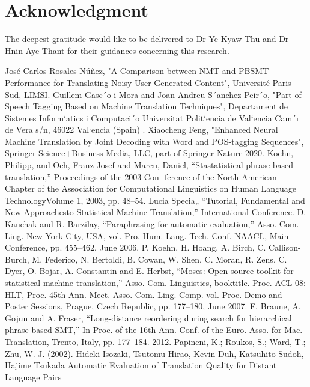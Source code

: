 \documentclass[conference]{IEEEtran}
\begin{document}
\section*{Acknowledgment}
The deepest gratitude would like to be delivered to Dr Ye Kyaw Thu and Dr Hnin Aye Thant for their guidances concerning this research.
\begin{thebibliography}{00}
 José Carlos Rosales Núñez, "A Comparison between NMT and PBSMT Performance for Translating Noisy User-Generated Content", Université Paris Sud, LIMSI.
 Guillem Gasc´o i Mora and Joan Andreu S´anchez Peir´o, "Part-of-Speech Tagging Based on Machine Translation Techniques", Departament de Sistemes Inform`atics i Computaci´o Universitat Polit`encia de Val`encia    Cam´ı de Vera s/n, 46022 Val`encia (Spain) .
 Xiaocheng Feng, "Enhanced Neural Machine Translation by Joint Decoding with Word and POS-tagging Sequences", Springer Science+Business Media, LLC, part of Springer Nature 2020.
 Koehn, Philipp, and Och, Franz Josef and Marcu, Daniel, “Stastatistical phrase-based translation,” Proceedings of the 2003 Con-
ference of the North American Chapter of the Association for Computational Linguistics on Human Language TechnologyVolume 1, 2003, pp. 48–54.
 Lucia Specia„ “Tutorial, Fundamental and New Approachesto Statistical Machine Translation,” International Conference.
 D. Kauchak and R. Barzilay, ``Paraphrasing for automatic evaluation,'' Asso. Com. Ling. New York City, USA, vol. Pro. Hum. Lang. Tech. Conf. NAACL, Main Conference, pp. 455--462, June 2006.
 P. Koehn, H. Hoang, A. Birch, C. Callison-Burch, M. Federico, N. Bertoldi, B. Cowan, W. Shen, C. Moran, R. Zens, C. Dyer, O. Bojar, A. Constantin and E. Herbst, ``Moses: Open source toolkit for statistical machine translation,'' Asso. Com. Linguistics, booktitle. Proc. ACL-08: HLT, Proc. 45th Ann. Meet.  Asso. Com. Ling. Comp. vol. Proc. Demo and Poster Sessions, Prague, Czech Republic, pp. 177--180, June 2007.
 F. Braune, A. Gojun and A. Fraser, ``Long-distance reordering during search for hierarchical phrase-based SMT,'' In Proc. of the 16th Ann. Conf. of the Euro. Asso. for Mac. Translation, Trento, Italy, pp. 177--184. 2012.
 Papineni, K.; Roukos, S.; Ward, T.; Zhu, W. J. (2002). 
 Hideki Isozaki, Tsutomu Hirao, Kevin Duh, Katsuhito Sudoh, Hajime Tsukada Automatic Evaluation of Translation Quality for Distant Language Pairs
\end{thebibliography}
\vspace{12pt}
\color{red}
\end{document}
